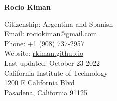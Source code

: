 \documentclass[10pt]{cv}
\newcommand{\firstpagestyle}{empty} %
\begin{document}
\thispagestyle{\firstpagestyle} 
\begin{center}
{\LARGE \textbf{\sc Rocio Kiman}}\\
\bigskip
\bigskip
\end{center}
\normalsize
  
\addresses
{
Citizenship: Argentina and Spanish\\
Email: rociokiman@gmail.com\\
Phone: +1 (908) 737-2957 \\
Website: \href{https://rkiman.github.io}{rkiman.github.io}\\
Last updated: October 23 2022\\
}
{
California Institute of Technology\\
1200 E California Blvd\\
Pasadena, California 91125
}
\end{document}
